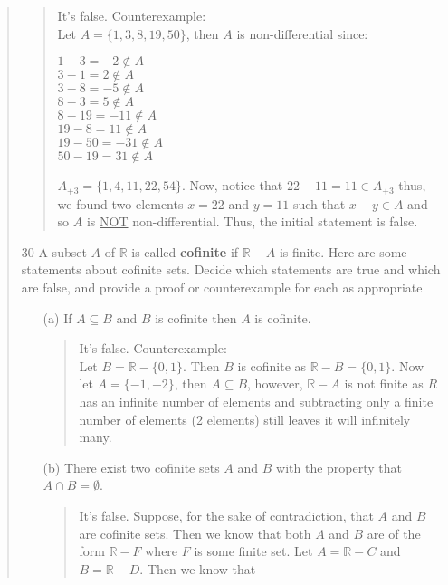 \documentclass[12pt, a4paper]{article}                      %
\begin{document}
\begin{enumerate}
\begin{quote}
\begin{itemize}
\begin{quote}
It's false. Counterexample:\\
Let $A = \{1, 3, 8, 19, 50\}$, then $A$ is non-differential since:
\begin{center}
$1 - 3 = -2 \notin A$\\
$3 - 1 = 2 \notin A$\\
$3 - 8 = -5 \notin A$\\
$8 - 3 = 5 \notin A$\\
$8 - 19 = -11 \notin A$\\
$19 - 8 = 11 \notin A$\\
$19 - 50 = -31 \notin A$\\
$50 - 19 = 31 \notin A$\\
\end{center}
$A_{+3} = \{1, 4, 11, 22, 54\}$. Now, notice that $22 - 11 = 11 \in A_{+3}$ thus, we found
two elements $x = 22$ and $y = 11$ such that $x - y \in A$ and so $A$ is \underline{NOT} non-differential.
Thus, the initial statement is false.
\end{quote}
\end{itemize}
\item[30]
A subset $A$ of $\mathbb{R}$ is called \textbf{cofinite} if $\mathbb{R} - A$ is finite. Here are some statements about
cofinite sets. Decide which statements are true and which are false, and provide a proof
or counterexample for each as appropriate
\begin{itemize}
\item[(a)]
If $A \subseteq B$ and $B$ is cofinite then $A$ is cofinite.
\begin{quote}
It's false. Counterexample:\\
Let $B = \mathbb{R} - \{0, 1\}$. Then $B$ is cofinite as $\mathbb{R} - B = \{0, 1\}$.
Now let $A = \{-1, -2\}$, then $A \subseteq B$, however, $\mathbb{R} - A$ is not finite
as $R$ has an infinite number of elements and subtracting only a finite number of elements
(2 elements) still leaves it will infinitely many.
\end{quote}
\item[(b)]
There exist two cofinite sets $A$ and $B$ with the property that\\
$A \cap B = \emptyset$.
\begin{quote}
It's false. Suppose, for the sake of contradiction, that $A$ and $B$ are cofinite
sets. Then we know that both $A$ and $B$ are of the form $\mathbb{R} - F$ where $F$
is some finite set. Let $A = \mathbb{R} - C$ and $B = \mathbb{R} - D$. Then we know that

\end{quote}
\end{itemize}
\end{quote}
\end{enumerate}
\end{document}
